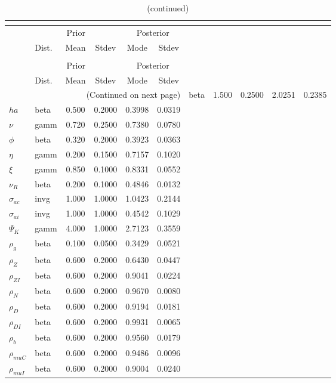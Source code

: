  
\begin{center}
\begin{longtable}{llcccc} 
\caption{Results from posterior maximization (parameters)}\\
 \label{Table:Posterior:1}\\
\toprule 
  & \multicolumn{3}{c}{Prior}  &  \multicolumn{2}{c}{Posterior} \\
  \cmidrule(r{.75em}){2-4} \cmidrule(r{.75em}){5-6}
  & Dist. & Mean  & Stdev & Mode & Stdev \\ 
\midrule \endfirsthead 
\caption{(continued)}\\
 \bottomrule 
  & \multicolumn{3}{c}{Prior}  &  \multicolumn{2}{c}{Posterior} \\
  \cmidrule(r{.75em}){2-4} \cmidrule(r{.75em}){5-6}
  & Dist. & Mean  & Stdev & Mode & Stdev \\ 
\midrule \endhead 
\bottomrule \multicolumn{6}{r}{(Continued on next page)}\endfoot 
\bottomrule\endlastfoot 
${\sigma}$ & beta &   1.500 & 0.2500 &   2.0251 &  0.2385 \\ 
${ha}$ & beta &   0.500 & 0.2000 &   0.3998 &  0.0319 \\ 
$\nu$ & gamm &   0.720 & 0.2500 &   0.7380 &  0.0780 \\ 
${\phi}$ & beta &   0.320 & 0.2000 &   0.3923 &  0.0363 \\ 
${\eta}$ & gamm &   0.200 & 0.1500 &   0.7157 &  0.1020 \\ 
$\xi$ & gamm &   0.850 & 0.1000 &   0.8331 &  0.0552 \\ 
${\nu_R}$ & beta &   0.200 & 0.1000 &   0.4846 &  0.0132 \\ 
${\sigma_{ac}}$ & invg &   1.000 & 1.0000 &   1.0423 &  0.2144 \\ 
${\sigma_{ai}}$ & invg &   1.000 & 1.0000 &   0.4542 &  0.1029 \\ 
${\Psi_{K}}$ & gamm &   4.000 & 1.0000 &   2.7123 &  0.3559 \\ 
${\rho_g}$ & beta &   0.100 & 0.0500 &   0.3429 &  0.0521 \\ 
${\rho_Z}$ & beta &   0.600 & 0.2000 &   0.6430 &  0.0447 \\ 
${\rho_{ZI}}$ & beta &   0.600 & 0.2000 &   0.9041 &  0.0224 \\ 
${\rho_N}$ & beta &   0.600 & 0.2000 &   0.9670 &  0.0080 \\ 
${\rho_D}$ & beta &   0.600 & 0.2000 &   0.9194 &  0.0181 \\ 
${\rho_{DI}}$ & beta &   0.600 & 0.2000 &   0.9931 &  0.0065 \\ 
${\rho_b}$ & beta &   0.600 & 0.2000 &   0.9560 &  0.0179 \\ 
${\rho_{muC}}$ & beta &   0.600 & 0.2000 &   0.9486 &  0.0096 \\ 
${\rho_{muI}}$ & beta &   0.600 & 0.2000 &   0.9004 &  0.0240 \\ 
\end{longtable}
 \end{center}
